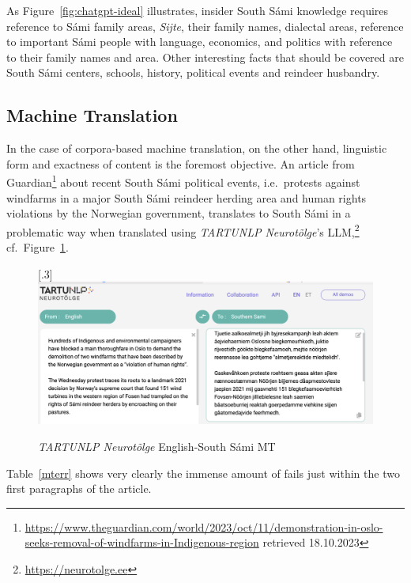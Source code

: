 \documentclass[free]{flammie}
\begin{document}
As Figure~\ref{fig:chatgpt-ideal} illustrates, insider South Sámi knowledge
requires reference to Sámi family areas, \textit{Sijte}, their family names,
dialectal areas, reference to important Sámi people with language, economics,
and politics with reference to their family names and area. Other interesting
facts that should be covered are South Sámi centers, schools, history, political
events and reindeer husbandry.

\subsection{Machine Translation}

In the case of corpora-based machine translation, on the other hand, linguistic
form and exactness of content is the foremost objective.  An article from
Guardian\footnote{\url{https://www.theguardian.com/world/2023/oct/11/demonstration-in-oslo-seeks-removal-of-windfarms-in-Indigenous-region}
\smaller{} retrieved 18.10.2023} about recent South Sámi political events, i.e.\
protests against windfarms in a major South Sámi reindeer herding area and human
rights violations by the Norwegian government, translates to South Sámi in a
problematic way when translated using \textit{TARTUNLP Neurotõlge}'s
LLM,\footnote{\url{https://neurotolge.ee}} cf.\ Figure~\ref{engsma}.

    \begin{figure}[htb]
    \begin{center}
    \scalebox{.3}[.3]{\includegraphics{tartusma.png}}
    \caption{\textit{TARTUNLP Neurotõlge} English-South Sámi MT\label{engsma}}
    \end{center}
    \end{figure}

Table~\ref{mterr} shows very clearly the immense amount of fails just within the
two first paragraphs of the article.
\end{document}
